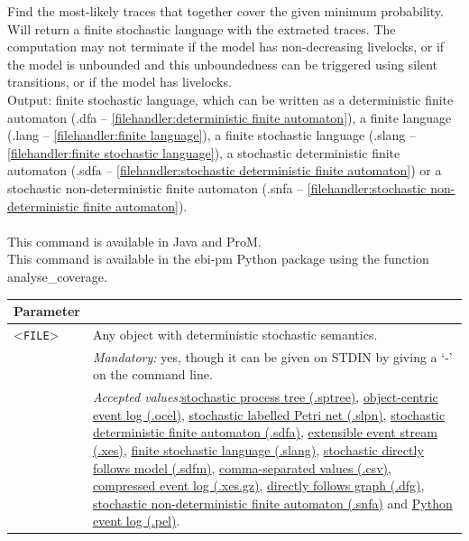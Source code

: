{Find the most-likely traces that together cover the given minimum probability.
Will return a finite stochastic language with the extracted traces.
The computation may not terminate if the model has non-decreasing livelocks, or if the model is unbounded and this unboundedness can be triggered using silent transitions, or if the model has livelocks.\\
\noindent Output: finite stochastic language, which can be written as a deterministic finite automaton (.dfa -- \cref{filehandler:deterministic finite automaton}), a finite language (.lang -- \cref{filehandler:finite language}), a finite stochastic language (.slang -- \cref{filehandler:finite stochastic language}), a stochastic deterministic finite automaton (.sdfa -- \cref{filehandler:stochastic deterministic finite automaton}) or a stochastic non-deterministic finite automaton (.snfa -- \cref{filehandler:stochastic non-deterministic finite automaton}).\\
\\This command is available in Java and ProM.
\\This command is available in the ebi-pm Python package using the function analyse\_coverage.
\begin{tabularx}{\linewidth}{lX}
\toprule
Parameter \\\midrule
<\texttt{FILE}>&Any object with deterministic stochastic semantics.\\
&\textit{Mandatory:} \quad yes, though it can be given on STDIN by giving a `-' on the command line.\\
&\textit{Accepted values:}\quad \hyperref[filehandler:stochastic process tree]{stochastic process tree (.sptree)}, \hyperref[filehandler:object-centric event log]{object-centric event log (.ocel)}, \hyperref[filehandler:stochastic labelled Petri net]{stochastic labelled Petri net (.slpn)}, \hyperref[filehandler:stochastic deterministic finite automaton]{stochastic deterministic finite automaton (.sdfa)}, \hyperref[filehandler:extensible event stream]{extensible event stream (.xes)}, \hyperref[filehandler:finite stochastic language]{finite stochastic language (.slang)}, \hyperref[filehandler:stochastic directly follows model]{stochastic directly follows model (.sdfm)}, \hyperref[filehandler:comma-separated values]{comma-separated values (.csv)}, \hyperref[filehandler:compressed event log]{compressed event log (.xes.gz)}, \hyperref[filehandler:directly follows graph]{directly follows graph (.dfg)}, \hyperref[filehandler:stochastic non-deterministic finite automaton]{stochastic non-deterministic finite automaton (.snfa)} and \hyperref[filehandler:Python event log]{Python event log (.pel)}.\\

\end{tabularx}}
